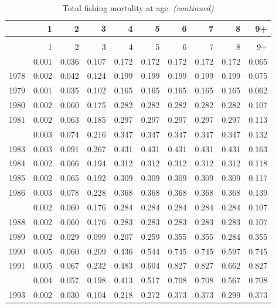 \documentclass[
]{article}
\begin{document}
\begin{longtable}[t]{lrrrrrrrrr}
\caption{\label{tab:FAA-tot-table}Total fishing mortality at age.}\\
\toprule
  & 1 & 2 & 3 & 4 & 5 & 6 & 7 & 8 & 9+\\
\midrule
\endfirsthead
\caption[]{Total fishing mortality at age. \textit{(continued)}}\\
\toprule
  & 1 & 2 & 3 & 4 & 5 & 6 & 7 & 8 & 9+\\
\midrule
\endhead

\endfoot
\bottomrule
\endlastfoot
1977 & 0.001 & 0.036 & 0.107 & 0.172 & 0.172 & 0.172 & 0.172 & 0.172 & 0.065\\
1978 & 0.002 & 0.042 & 0.124 & 0.199 & 0.199 & 0.199 & 0.199 & 0.199 & 0.075\\
1979 & 0.001 & 0.035 & 0.102 & 0.165 & 0.165 & 0.165 & 0.165 & 0.165 & 0.062\\
1980 & 0.002 & 0.060 & 0.175 & 0.282 & 0.282 & 0.282 & 0.282 & 0.282 & 0.107\\
1981 & 0.002 & 0.063 & 0.185 & 0.297 & 0.297 & 0.297 & 0.297 & 0.297 & 0.113\\
\addlinespace
1982 & 0.003 & 0.074 & 0.216 & 0.347 & 0.347 & 0.347 & 0.347 & 0.347 & 0.132\\
1983 & 0.003 & 0.091 & 0.267 & 0.431 & 0.431 & 0.431 & 0.431 & 0.431 & 0.163\\
1984 & 0.002 & 0.066 & 0.194 & 0.312 & 0.312 & 0.312 & 0.312 & 0.312 & 0.118\\
1985 & 0.002 & 0.065 & 0.192 & 0.309 & 0.309 & 0.309 & 0.309 & 0.309 & 0.117\\
1986 & 0.003 & 0.078 & 0.228 & 0.368 & 0.368 & 0.368 & 0.368 & 0.368 & 0.139\\
\addlinespace
1987 & 0.002 & 0.060 & 0.176 & 0.284 & 0.284 & 0.284 & 0.284 & 0.284 & 0.107\\
1988 & 0.002 & 0.060 & 0.176 & 0.283 & 0.283 & 0.283 & 0.283 & 0.283 & 0.107\\
1989 & 0.002 & 0.029 & 0.099 & 0.207 & 0.259 & 0.355 & 0.355 & 0.284 & 0.355\\
1990 & 0.005 & 0.060 & 0.209 & 0.436 & 0.544 & 0.745 & 0.745 & 0.597 & 0.745\\
1991 & 0.005 & 0.067 & 0.232 & 0.483 & 0.604 & 0.827 & 0.827 & 0.662 & 0.827\\
\addlinespace
1992 & 0.004 & 0.057 & 0.198 & 0.413 & 0.517 & 0.708 & 0.708 & 0.567 & 0.708\\
1993 & 0.002 & 0.030 & 0.104 & 0.218 & 0.272 & 0.373 & 0.373 & 0.299 & 0.373\\

\end{longtable}
\end{document}
